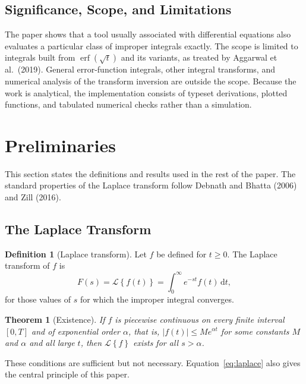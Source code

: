 \documentclass[12pt,a4paper]{article}
\theoremstyle{definition}
\newtheorem{definition}{Definition}[section]
\theoremstyle{plain}
\newtheorem{theorem}{Theorem}[section]
\theoremstyle{remark}
\newcommand{\erf}{\operatorname{erf}}
\newcommand{\Lap}[1]{\mathcal{L}\!\left\{#1\right\}}
\newcommand{\dd}{\,\mathrm{d}}
\begin{document}
	\subsection{Significance, Scope, and Limitations}
	
	The paper shows that a tool usually associated with differential equations also evaluates a particular class of improper integrals exactly. The scope is limited to integrals built from $\erf(\sqrt{t})$ and its variants, as treated by Aggarwal et al.\ (2019). General error-function integrals, other integral transforms, and numerical analysis of the transform inversion are outside the scope. Because the work is analytical, the implementation consists of typeset derivations, plotted functions, and tabulated numerical checks rather than a simulation.
	
	\section{Preliminaries}
	
	This section states the definitions and results used in the rest of the paper. The standard properties of the Laplace transform follow Debnath and Bhatta (2006) and Zill (2016).
	
	\subsection{The Laplace Transform}
	
	\begin{definition}[Laplace transform]\label{def:laplace}
		Let $f$ be defined for $t\ge 0$. The Laplace transform of $f$ is
		\begin{equation}\label{eq:laplace}
			F(s)=\Lap{f(t)}=\int_0^\infty e^{-st}f(t)\dd t,
		\end{equation}
		for those values of $s$ for which the improper integral converges.
	\end{definition}
	
	\begin{theorem}[Existence]\label{thm:existence}
		If $f$ is piecewise continuous on every finite interval $[0,T]$ and of exponential order $\alpha$, that is, $|f(t)|\le Me^{\alpha t}$ for some constants $M$ and $\alpha$ and all large $t$, then $\Lap{f}$ exists for all $s>\alpha$.
	\end{theorem}
	
	These conditions are sufficient but not necessary. Equation~\eqref{eq:laplace} also gives the central principle of this paper.
	
\end{document}
